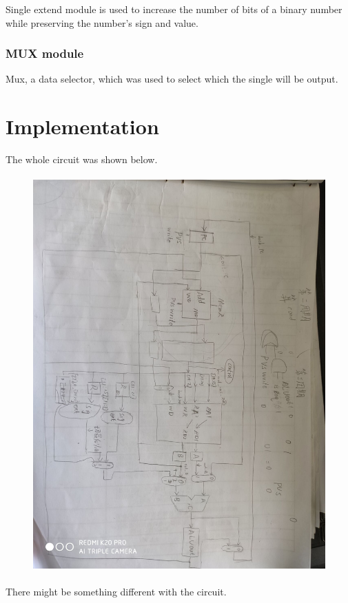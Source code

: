 \documentclass[12pt,a4paper]{article}
\begin{document}
Single extend module is used to increase the number of bits of a binary number while preserving the number's sign and value. 

\subsubsection{MUX module}

Mux, a data selector, which was used to select which the single will be output.

\newpage

\section{Implementation}

The whole circuit was shown below.

\begin{figure}[H]
  \centering
  \includegraphics[height=6in, angle=90]{Lens.jpg}
  \end{figure}

There might be something different with the circuit.

\newpage
\end{document}
